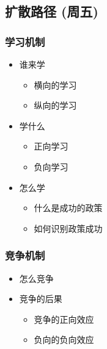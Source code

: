 \documentclass[
  12pt,
]{ctexart}
\begin{document}
\hypertarget{ux6269ux6563ux8defux5f84-ux5468ux4e94}{%
\subsection{扩散路径 (周五)}\label{ux6269ux6563ux8defux5f84-ux5468ux4e94}}

\hypertarget{ux5b66ux4e60ux673aux5236}{%
\subsubsection{学习机制}\label{ux5b66ux4e60ux673aux5236}}

\begin{itemize}
\item
  谁来学

  \begin{itemize}
  \item
    横向的学习
  \item
    纵向的学习
  \end{itemize}
\item
  学什么

  \begin{itemize}
  \item
    正向学习
  \item
    负向学习
  \end{itemize}
\item
  怎么学

  \begin{itemize}
  \item
    什么是成功的政策
  \item
    如何识别政策成功
  \end{itemize}
\end{itemize}

\hypertarget{ux7adeux4e89ux673aux5236}{%
\subsubsection{竞争机制}\label{ux7adeux4e89ux673aux5236}}

\begin{itemize}
\item
  怎么竞争
\item
  竞争的后果

  \begin{itemize}
  \item
    竞争的正向效应
  \item
    负向的负向效应
  \end{itemize}
\end{itemize}
\end{document}

